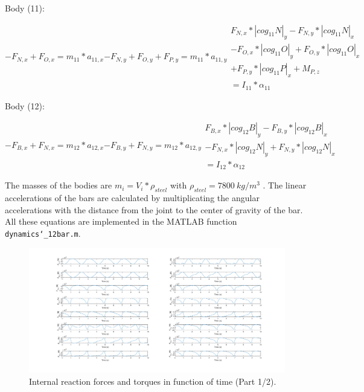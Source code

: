 \documentclass[a4paper]{article}
\begin{document}
Body (11):

\begin{subequations}
	\begin{equation}
		-F_{N,x}+F_{O,x}=m_{11}*a_{11,x}
	\end{equation}
	\begin{equation}
		-F_{N,y}+F_{O,y}+F_{P,y}=m_{11}*a_{11,y}
	\end{equation}
	\begin{equation}
	\begin{split}
	F_{N,x}*|cog_{11}N|_y-F_{N,y}*|cog_{11}N|_x\\-F_{O,x}*|cog_{11}O|_y+F_{O,y}*|cog_{11}O|_x\\+F_{P,y}*|cog_{11}P|_x+M_{P,z}\\=I_{11}*\alpha_{11}
	\end{split}
	\end{equation}
\end{subequations}

Body (12):

\begin{subequations}
	\begin{equation}
		-F_{B,x}+F_{N,x}=m_{12}*a_{12,x}
	\end{equation}
	\begin{equation}
		-F_{B,y}+F_{N,y}=m_{12}*a_{12,y}
	\end{equation}
	\begin{equation}
	\begin{split}
	F_{B,x}*|cog_{12}B|_y-F_{B,y}*|cog_{12}B|_x\\-F_{N,x}*|cog_{12}N|_y+F_{N,y}*|cog_{12}N|_x\\=I_{12}*\alpha_{12}
	\end{split}
	\end{equation}
\end{subequations}

The masses of the bodies are \(m_i=V_i*\rho_{steel}\) with \(\rho_{steel}=7800~\si{kg/m^3}\) \cite{steel1}. The linear accelerations of the bars are calculated by multiplicating the angular accelerations with the distance from the joint to the center of gravity of the bar. All these equations are implemented in the MATLAB function \texttt{dynamics\char`_12bar.m}.

\begin{figure}[h]
	\centering
	\includegraphics[width = .9\textwidth]{dynplot1.png}
	
	\caption{Internal reaction forces and torques in function of time (Part 1/2).}
	\label{fig:dynplot1}
	
\end{figure}
\end{document}
